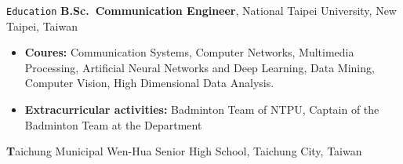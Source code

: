 \begin{rubric}{\faGraduationCap\texttt{Education}}
    \entry*[09.2016 -- 06.2020]%
        \textbf{B.Sc.~Communication Engineer}, National Taipei University, New Taipei, Taiwan
            \begin{itemize}[itemsep=0.5ex,parsep=0.5ex,topsep=0.5ex,partopsep=0.5ex, before={\vspace{-\baselineskip}\vspace{\itemsep}\parskip=0pt},
            after={\vspace{-\baselineskip}\vspace{-\itemsep}\parskip=0pt}]
                  \item \textbf{Coures:} Communication Systems, Computer Networks, Multimedia Processing, Artificial Neural Networks and Deep Learning, Data Mining, Computer Vision, High Dimensional Data Analysis.
                  \item \textbf{Extracurricular activities:} Badminton Team of NTPU, Captain of the Badminton Team at the Department
            \end{itemize}
    \entry*[08.2018 -- 08.2018]%
        \textbf Taichung Municipal Wen-Hua Senior High School, Taichung City, Taiwan
    \end{rubric}
